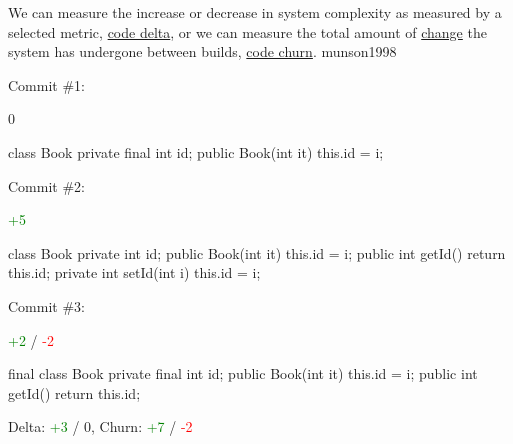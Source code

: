 \documentclass{article}
\begin{document}


  {We can measure the increase or decrease in system complexity as measured by a selected metric, \ul{code delta}, or we can measure the total amount of \ul{change} the system has undergone between builds, \ul{code churn}.}
  {munson1998}

\begin{pptWide}{3}
Commit \#1:\par
0\par
{\small\begin{ffcode}
class Book
  private final int id;
  public Book(int it)
    this.id = i;
\end{ffcode}
}
\par\columnbreak\par
Commit \#2:\par
\textcolor{green}{+5}\par
{\small\begin{ffcode}
class Book
  private int id;
  public Book(int it)
    this.id = i;
  public int getId()
    return this.id;
  private int setId(int i)
    this.id = i;
\end{ffcode}
}
\par\columnbreak\par
Commit \#3:\par
\textcolor{green}{+2} / \textcolor{red}{-2}\par
{\small\begin{ffcode}
final class Book
  private final int id;
  public Book(int it)
    this.id = i;
  public int getId()
    return this.id;
\end{ffcode}
}
\end{pptWide}
Delta: \textcolor{green}{+3} / 0, Churn: \textcolor{green}{+7} / \textcolor{red}{-2}
\plush{}
\end{document}
